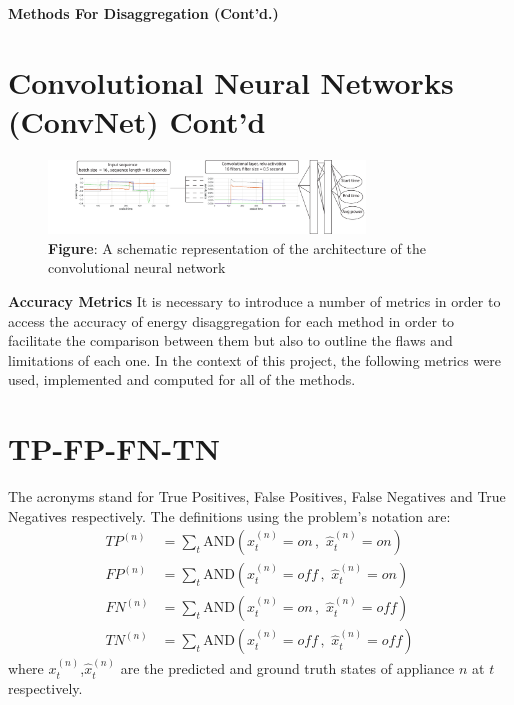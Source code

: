 \documentclass[landscape,fontscale=0.48,margin=2cm,paperwidth=135truecm,paperheight=89truecm]{baposter}
\begin{document}
\begin{poster}
\begin{posterbox}[column=2]{\LARGE \bfseries Methods For Disaggregation (Cont'd.)}
\section*{Convolutional Neural Networks (ConvNet) Cont'd}
%
\begin{figure}
\begin{center}
\includegraphics[width=0.75\textwidth]{convnet_architecture}
\caption*{\footnotesize  \textbf{Figure}: A schematic representation of the architecture of the convolutional neural network} \vspace*{-1 cm}
\end{center}
\end{figure}
\vspace{3em}
\end{posterbox}



%
\begin{posterbox}[column=2,below=auto,height = bottom]{\LARGE \bfseries Accuracy Metrics}
It is necessary to introduce a number of metrics in order to access the accuracy of energy disaggregation for each method in order to facilitate the comparison between them but also to outline the flaws and limitations of each one. In the context of this project, the following metrics were used, implemented and computed for all of the methods.

\section*{TP-FP-FN-TN}
The acronyms stand for True Positives, False Positives, False Negatives and True Negatives respectively. The definitions using the problem's notation are:
%
\begin{align}
  TP^{(n)} & = \sum_t \mathrm{AND}\left(x_t^{(n)}=on \,,\,\, \hat{x}_t^{(n)}=on\right) \\[6pt]
  FP^{(n)} & = \sum_t \mathrm{AND}\left(x_t^{(n)}=off \,,\,\, \hat{x}_t^{(n)}=on\right) \\[6pt]
  FN^{(n)} & = \sum_t \mathrm{AND}\left(x_t^{(n)}=on \,,\,\, \hat{x}_t^{(n)}=off\right) \\[6pt]
  TN^{(n)} & = \sum_t \mathrm{AND}\left(x_t^{(n)}=off \,,\,\, \hat{x}_t^{(n)}=off\right)
\end{align}
%
where $x_t^{(n)}$,$\hat{x}_t^{(n)}$ are the predicted and ground truth states of appliance $n$ at $t$ respectively.


\end{posterbox}
\end{poster}
\end{document}
